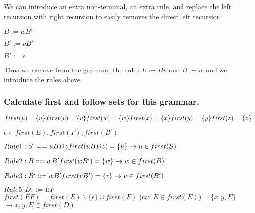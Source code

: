 \documentclass[a4paper, 12pt]{article}
\begin{document}
            We can introduce an extra non-terminal, an extra rule, and replace the left recursion with right recursion to easily removes the direct left recursion:
            
            \begin{center}
            
                $B:=wB'$
                
                $B':=vB'$
                
                $B':=\epsilon$
                
                Thus we remove from the grammar the rules $B:=Bv$ and $B:=w$ and we introduce the rules above.
            \end{center}
            
        \subsubsection{Calculate first and follow sets for this grammar.}
                        
            $first(u) = \{u\}\\
            first(v) = \{v\}\\
            first(w) = \{w\}\\
            first(x) = \{x\}\\
            first(y) = \{y\}\\
            first(z) = \{z\}$
                
            $\epsilon \in first(E), first(F), first(B')$

            $Rule 1: S:== uBDz\\
            first(uBDz) = \{u\}\\
            \rightarrow u \in first(S)$
            
            $Rule 2: B::=wB'\\
            first(wB')=\{w\}\\
            \rightarrow w\in first(B)$
            
            $Rule 3: B'::= wB'\\
            first(vB') = \{v\}\\
            \rightarrow v \in first(B')$
            
            $Rule 5: D::= EF$\\
            $first(EF) = first(E) \backslash \{\epsilon\} \cup first(F)$ (car $E\in first(E)$)$=\{x,y,E\}$\\
            $\rightarrow {x,y,E} \subset first(D)$
            
\end{document}
